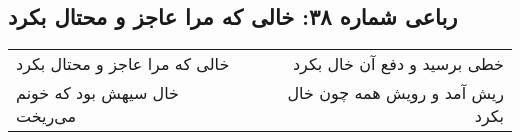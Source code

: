 \begin{center}
\section*{رباعی شماره ۳۸: خالی که مرا عاجز و محتال بکرد}
\label{sec:038}
\begin{longtable}{l p{0.5cm} r}
خالی که مرا عاجز و محتال بکرد
&&
خطی برسید و دفع آن خال بکرد
\\
خال سیهش بود که خونم می‌ریخت
&&
ریش آمد و رویش همه چون خال بکرد
\\
\end{longtable}
\end{center}
